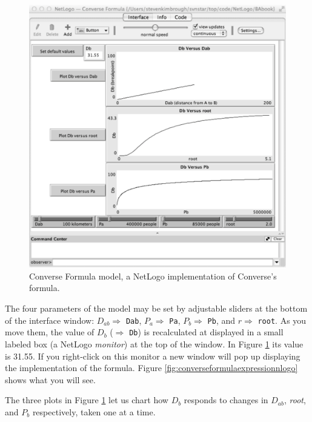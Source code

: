 \begin{figure}[htbp] %
   \centering
   \includegraphics[width=\textwidth]{figures/ConverseFormula1.pdf} 
   \caption{Converse Formula model, a NetLogo implementation of Converse's formula.}
   \label{fig:converseformulanlogo}
\end{figure}

The four parameters of the model may be set by adjustable sliders at the bottom of the interface window: $D_{ab} \Rightarrow$ {\tt Dab}, $P_a \Rightarrow$  {\tt Pa}, $P_b \Rightarrow$ {\tt Pb}, and $r \Rightarrow$ {\tt root}. As you move them, the value of $D_b$ ($\Rightarrow$ {\tt Db}) is recalculated at displayed in a small labeled box (a NetLogo \emph{monitor}) at the top of the window. In Figure \ref{fig:converseformulanlogo} its value is 31.55. If you right-click on this monitor a new window will pop up displaying the implementation of the formula. Figure \ref{fig:converseformulaexpressionnlogo} shows what you will see.

The three plots in Figure \ref{fig:converseformulanlogo} let us chart how $D_b$ responds to changes in $D_{ab}$, {\it root}, and $P_b$ respectively, taken one at a time.


